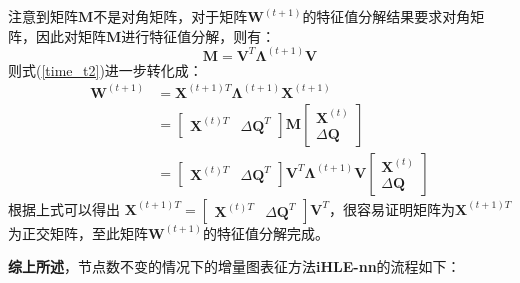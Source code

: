 注意到矩阵$\textbf{M}$不是对角矩阵，对于矩阵$\textbf{W}^{(t+1)}$的特征值分解结果要求对角矩阵，因此对矩阵$\textbf{M}$进行特征值分解，则有：
\begin{equation}
	\textbf{M} =\textbf{V}^T \bm{\Lambda}^{(t+1)} \textbf{V}
\end{equation}
则式(\ref{time_t2})进一步转化成：
\begin{equation}
\begin{aligned}
\textbf{W}^{(t+1)} &= \textbf{X}^{(t+1)T} \bm{\Lambda}^{(t+1)} \textbf{X} ^{(t+1)} \\
&= \begin{bmatrix} \textbf{X}^{(t)T} & \Delta\textbf{Q}^{T} \end{bmatrix}
\textbf{M} \begin{bmatrix} \textbf{X}^{(t)} \\ \Delta\textbf{Q} \end{bmatrix} \\
&= \begin{bmatrix} \textbf{X}^{(t)T} & \Delta\textbf{Q}^{T} \end{bmatrix} \textbf{V}^T \bm{\Lambda}^{(t+1)} \textbf{V}
\begin{bmatrix} \textbf{X}^{(t)} \\ \Delta\textbf{Q} \end{bmatrix}
\end{aligned}
\end{equation}
根据上式可以得出 $\textbf{X}^{(t+1)T} = \begin{bmatrix} \textbf{X}^{(t)T} & \Delta\textbf{Q}^{T} \end{bmatrix} \textbf{V}^T$，很容易证明矩阵为$\textbf{X}^{(t+1)T}$为正交矩阵，至此矩阵$\textbf{W}^{(t+1)}$的特征值分解完成。

\textbf{综上所述}，节点数不变的情况下的增量图表征方法\textbf{iHLE-nn}的流程如下：

